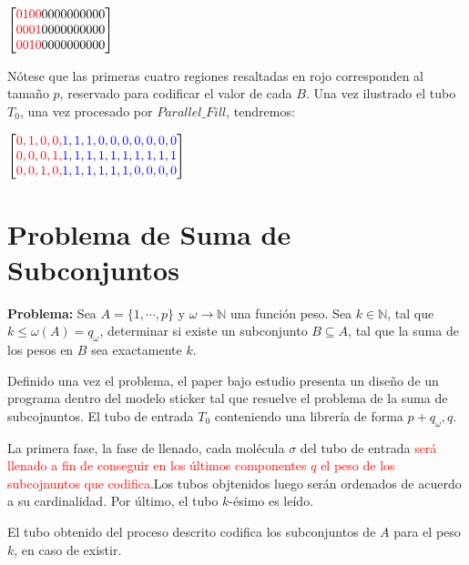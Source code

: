 \documentclass[12pt, letterpaper, twoside]{article}
\begin{document}
    $
        \begin{bmatrix}
        \textcolor{red}{0 1 0 0} 0 0 0 0 0 0 0 0 0 0 \\
        \textcolor{red}{0 0 0 1} 0 0 0 0 0 0 0 0 0 0 \\
        \textcolor{red}{0 0 1 0} 0 0 0 0 0 0 0 0 0 0
        \end{bmatrix}
    $


Nótese que las primeras cuatro regiones resaltadas en rojo corresponden al tamaño $p$, reservado para codificar el valor de cada $B$. Una vez ilustrado el tubo $T_0$, una vez procesado por $Parallel\_Fill$, tendremos:


$
    \begin{bmatrix}
        \textcolor{red}{0, 1, 0, 0,} \textcolor{blue}{1, 1, 1, 0, 0, 0, 0, 0, 0, 0} \\
        \textcolor{red}{0, 0, 0, 1,} \textcolor{blue}{1, 1, 1, 1, 1, 1, 1, 1, 1, 1} \\
        \textcolor{red}{0, 0, 1, 0,} \textcolor{blue}{1, 1, 1, 1, 1, 1, 0, 0, 0, 0}
    \end{bmatrix}
$


    \section{Problema de Suma de Subconjuntos}
    \textbf{Problema:} Sea $A=\{1,\cdots,p\}$ y $\omega\rightarrow\mathbb{N}$ una función peso. Sea $k\in\mathbb{N}$, tal que $k\leq\omega(A)=q_\omega$, determinar si existe un subconjunto $B\subseteq A$, tal que la suma de los pesos en $B$ sea exactamente $k$.


    Definido una vez el problema, el paper bajo estudio presenta un diseño de un programa dentro del modelo sticker tal que resuelve el problema de la suma de subcojnuntos. El tubo de entrada $T_0$ conteniendo una librería de forma $p+q_\omega, q$. 


    La primera fase, la fase de llenado, cada molécula $\sigma$ del tubo de entrada \textcolor{red}{será llenado a fin de conseguir en los últimos componentes $q$ el peso de los subcojnuntos que codifica}.Los tubos objtenidos luego serán ordenados de acuerdo a su cardinalidad. Por último, el tubo $k$-ésimo es leído.

    El tubo obtenido del proceso descrito codifica los subconjuntos de $A$ para el peso $k$, en caso de existir.
\end{document}
